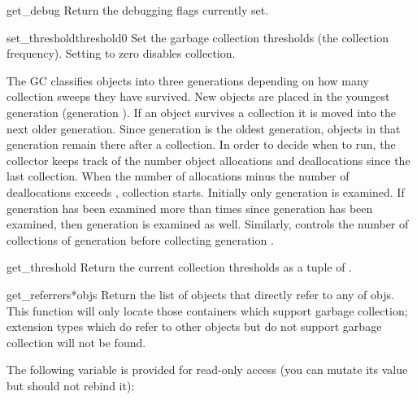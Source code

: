 \begin{funcdesc}{get_debug}{}
Return the debugging flags currently set.
\end{funcdesc}

\begin{funcdesc}{set_threshold}{threshold0}
Set the garbage collection thresholds (the collection frequency).
Setting  to zero disables collection.

The GC classifies objects into three generations depending on how many
collection sweeps they have survived.  New objects are placed in the
youngest generation (generation ).  If an object survives a
collection it is moved into the next older generation.  Since
generation  is the oldest generation, objects in that
generation remain there after a collection.  In order to decide when
to run, the collector keeps track of the number object allocations and
deallocations since the last collection.  When the number of
allocations minus the number of deallocations exceeds
, collection starts.  Initially only generation
 is examined.  If generation  has been examined more
than  times since generation  has been
examined, then generation  is examined as well.  Similarly,
 controls the number of collections of generation
 before collecting generation .
\end{funcdesc}

\begin{funcdesc}{get_threshold}{}
Return the current collection thresholds as a tuple of
.
\end{funcdesc}

\begin{funcdesc}{get_referrers}{*objs}
Return the list of objects that directly refer to any of objs. This
function will only locate those containers which support garbage
collection; extension types which do refer to other objects but do not
support garbage collection will not be found.
\end{funcdesc}

The following variable is provided for read-only access (you can
mutate its value but should not rebind it):

